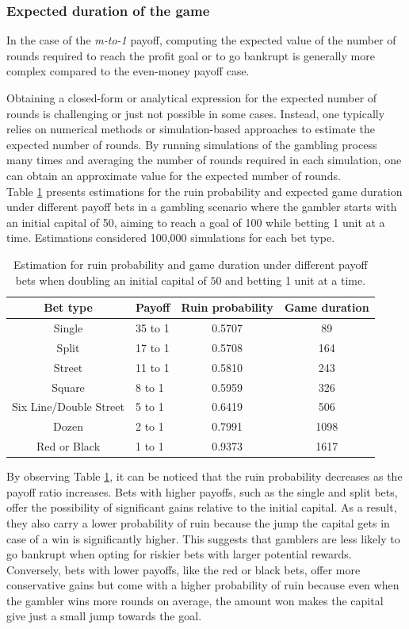 \documentclass[11pt,twoside]{article}
\numberwithin{Theorem}{section}
\numberwithin{Definition}{section}
\numberwithin{Lemma}{section}
\numberwithin{Algorithm}{section}
\numberwithin{equation}{section}
\begin{document}
\subsubsection{Expected duration of the game}

In the case of the \textit{m-to-1} payoff, computing the expected value of the number of rounds required to reach the profit goal or to go bankrupt is generally more complex compared to the even-money payoff case.

Obtaining a closed-form or analytical expression for the expected number of rounds is challenging or just not possible in some cases. Instead, one typically relies on numerical methods or simulation-based approaches to estimate the expected number of rounds. By running simulations of the gambling process many times and averaging the number of rounds required in each simulation, one can obtain an approximate value for the expected number of rounds.\\

Table \ref{diff_bets}  presents estimations for the ruin probability and expected game duration under different payoff bets in a gambling scenario where the gambler starts with an initial capital of 50, aiming to reach a goal of 100 while betting 1 unit at a time. Estimations considered 100,000 simulations for each bet type.
\clearpage
\begin{table}[h!] 
\centering
\caption{Estimation for ruin probability and game duration under different payoff bets when doubling an initial capital of $50$ and betting 1 unit at a time.}
\begin{tabular}{|c|l|c|c|} 
\hline
Bet type  & Payoff & Ruin probability& Game duration\\
\hline\hline
Single & 35 to 1 & 0.5707&89\\
Split  &  17 to 1&0.5708&164\\
Street &  11 to 1&0.5810&243\\
Square &  8 to 1&0.5959&326\\
Six Line/Double Street  & 5 to 1&0.6419&506\\
Dozen & 2 to 1&0.7991&1098\\
Red or Black & 1 to 1 &0.9373&1617\\
\hline
\end{tabular} \label{diff_bets}
\end{table}


By observing Table \ref{diff_bets}, it can be noticed that the ruin probability decreases as the payoff ratio increases. Bets with higher payoffs, such as the single and split bets, offer the possibility of significant gains relative to the initial capital. As a result, they also carry a lower probability of ruin because the jump the capital gets in case of a win is significantly higher. This suggests that gamblers are less likely to go bankrupt when opting for riskier bets with larger potential rewards. Conversely, bets with lower payoffs, like the red or black bets, offer more conservative gains but come with a higher probability of ruin because even when the gambler wins more rounds on average, the amount won makes the capital give just a small jump towards the goal.
\end{document}
